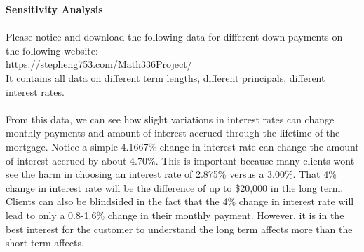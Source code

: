 \documentclass[12pt]{article}
\newenvironment{Section}[1]{}{\newpage}
\begin{document}
	\begin{Section}{Sensitivity}
		\textbf{\Huge Sensitivity Analysis}
		\\ \\
		Please notice and download the following data for different down payments on the following website:
		\\
		\url{https://stepheng753.com/Math336Project/}
		\\ 
		It contains all data on different term lengths, different principals, different interest rates.
		\\ \\
		From this data, we can see how slight variations in interest rates can change monthly payments and amount of interest accrued through the lifetime of the mortgage.  Notice a simple 4.1667\% change in interest rate can change the amount of interest accrued by about 4.70\%.  This is important because many clients wont see the harm in choosing an interest rate of 2.875\% versus a 3.00\%.  That 4\% change in interest rate will be the difference of up to \$20,000 in the long term.  Clients can also be blindsided in the fact that the 4\% change in interest rate will lead to only a 0.8-1.6\% change in their monthly payment.  However, it is in the best interest for the customer to understand the long term affects more than the short term affects.  
	\end{Section}
\end{document}
